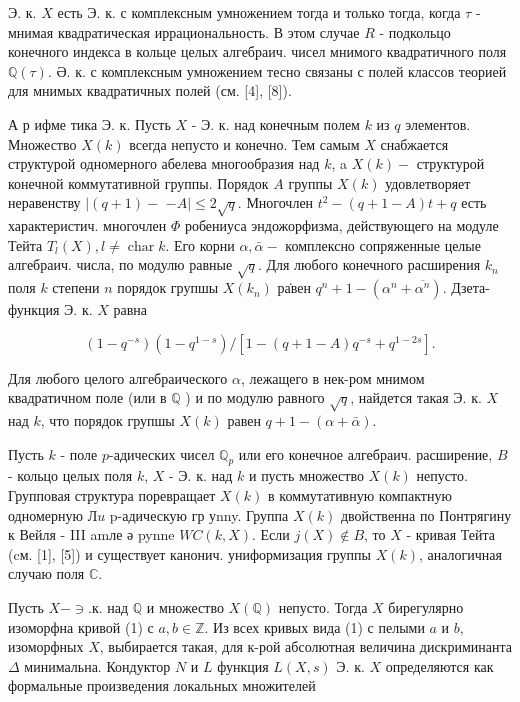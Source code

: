 \documentclass[10pt]{article}
\begin{document}
Э. к. $X$ есть Э. к. с комплексным умножением тогда и только тогда, когда $\tau$ - мнимая квадратическая иррациональность. В этом случае $R$ - подкольцо конечного индекса в кольце целых алгебраич. чисел мнимого квадратичного поля $\mathbb{Q}(\tau)$. Ә. к. с комплексным умножением тесно связаны с полей классов теорией для мнимых квадратичных полей (см. [4], [8]).



А р ифме тика Э. к. Пусть $X$ - Э. к. над конечным полем $k$ из $q$ элементов. Множество $X(k)$ всегда непусто и конечно. Тем самым $X$ снабжается структурой одномерного абелева многообразия над $k$, a $X(k)-$ структурой конечной коммутативной группы. Порядок $A$ группы $X(k)$ удовлетворяет неравенству $\mid(q+1)-$ $-A \mid \leqslant 2 \sqrt{q}$. Многочлен $t^{2}-(q+1-A) t+q$ есть характеристич. многочлен $\Phi$ робениуса эндожорфизма, действующего на модуле Тейта $T_{l}(X), l \neq \operatorname{char} k$. Его корни $\alpha, \bar{\alpha}-$ комплексно сопряженные целые алгебраич. числа, по модулю равные $\sqrt{q}$. Для любого конечного расширения $k_{n}$ поля $k$ степени $n$ порядок групшы $X\left(k_{n}\right)$ ра̇вен $q^{n}+1-\left(\alpha^{n}+\overline{\alpha^{n}}\right)$. Дзета-функция Э. к. $X$ равна



\[

\left(1-q^{-s}\right)\left(1-q^{1-s}\right) /\left[1-(q+1-A) q^{-s}+q^{1-2 s}\right] .

\]



Для любого целого алгебраического $\alpha$, лежащего в нек-ром мнимом квадратичном поле (или в $\mathbb{Q}$ ) и по модулю равного $\sqrt{q}$, найдется такая Э. к. $X$ над $k$, что порядок групшы $X(k)$ равен $q+1-(\alpha+\bar{\alpha})$.



Пусть $k$ - поле $p$-адических чисел $\mathbb{Q}_{p}$ или его конечное алгебраич. расширение, $B$ - кольцо целых поля $k$, $X$ - Э. к. над $k$ и пусть множество $X(k)$ непусто. Групповая структура поревращает $X(k)$ в коммутативную компактную одномерную $Л u$ p-адическую гр уnny. Группа $X(k)$ двойственна по Понтрягину к Вейля - III amле ә pynne $W C(k, X)$. Если $j(X) \notin B$, то $X$ - кривая Тейта (cм. [1], [5]) и существует канонич. униформизация группы $X(k)$, аналогичная случаю поля $\mathbb{C}$.



Пусть $X-\ni . к$. над $\mathbb{Q}$ и множество $X(\mathbb{Q})$ непусто. Тогда $X$ бирегулярно изоморфна кривой (1) с $a, b \in \mathbb{Z}$. Из всех кривых вида (1) с пелыми $a$ и $b$, изоморфных $X$, выбирается такая, для к-рой абсолютная величина дискриминанта $\Delta$ минимальна. Кондуктор $N$ и $L$ функция $L(X, s)$ Э. к. $X$ определяются как формальные произведения локальных множителей
\end{document}
